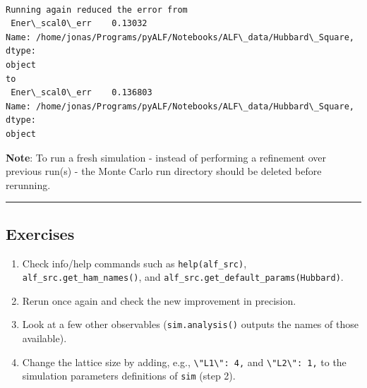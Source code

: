 \documentclass[11pt]{article}
\providecommand{\tightlist}{%
      \setlength{\itemsep}{0pt}\setlength{\parskip}{0pt}}
\begin{document}
    \begin{Verbatim}[commandchars=\\\{\}]

Running again reduced the error from
 Ener\_scal0\_err    0.13032
Name: /home/jonas/Programs/pyALF/Notebooks/ALF\_data/Hubbard\_Square, dtype:
object
to
 Ener\_scal0\_err    0.136803
Name: /home/jonas/Programs/pyALF/Notebooks/ALF\_data/Hubbard\_Square, dtype:
object
    \end{Verbatim}

    \textbf{Note}: To run a fresh simulation - instead of performing a
refinement over previous run(s) - the Monte Carlo run directory should
be deleted before rerunning.

    \begin{center}\rule{0.5\linewidth}{0.5pt}\end{center}

\hypertarget{exercises}{%
\subsection{Exercises}\label{exercises}}

\begin{enumerate}
\def\labelenumi{\arabic{enumi}.}
\tightlist
\item
  Check info/help commands such as \texttt{help(alf\_src)},
  \texttt{alf\_src.get\_ham\_names()}, and
  \texttt{alf\_src.get\_default\_params(\textquotesingle{}Hubbard\textquotesingle{})}.
\item
  Rerun once again and check the new improvement in precision.
\item
  Look at a few other observables (\texttt{sim.analysis()} outputs the
  names of those available).
\item
  Change the lattice size by adding, e.g.,
  \texttt{\textbackslash{}"L1\textbackslash{}":\ 4,} and
  \texttt{\textbackslash{}"L2\textbackslash{}":\ 1,} to the simulation
  parameters definitions of \texttt{sim} (step 2).
\end{enumerate}


    
    
    
\end{document}
